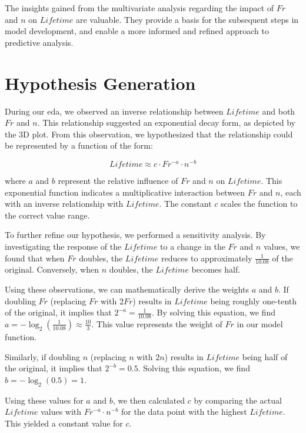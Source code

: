 The insights gained from the multivariate analysis regarding the impact of \(Fr\) and \(n\) on \(Lifetime\) are valuable. They provide a basis for the subsequent steps in model development, and enable a more informed and refined approach to predictive analysis.


\section{Hypothesis Generation}
\label{sec:bearings-hypothesis}

During our \ac{eda}, we observed an inverse relationship between \(Lifetime\) and both \(Fr\) and \(n\). This relationship suggested an exponential decay form, as depicted by the 3D plot. From this observation, we hypothesized that the relationship could be represented by a function of the form:

\begin{equation}
\label{eq:hypothesis}
Lifetime \approx c \cdot Fr^{-a} \cdot n^{-b}
\end{equation}

where \(a\) and \(b\) represent the relative influence of \(Fr\) and \(n\) on \(Lifetime\). This exponential function indicates a multiplicative interaction between \(Fr\) and \(n\), each with an inverse relationship with \(Lifetime\). The constant \(c\) scales the function to the correct value range.

To further refine our hypothesis, we performed a sensitivity analysis. By investigating the response of the \(Lifetime\) to a change in the \(Fr\) and \(n\) values, we found that when \(Fr\) doubles, the \(Lifetime\) reduces to approximately \(\frac{1}{10.08}\) of the original. Conversely, when \(n\) doubles, the \(Lifetime\) becomes half. 

Using these observations, we can mathematically derive the weights \(a\) and \(b\). If doubling \(Fr\) (replacing \(Fr\) with \(2Fr\)) results in \(Lifetime\) being roughly one-tenth of the original, it implies that \(2^{-a} = \frac{1}{10.08}\). By solving this equation, we find \(a = -\log_2(\frac{1}{10.08}) \approx \frac{10}{3}\). This value represents the weight of \(Fr\) in our model function.

Similarly, if doubling \(n\) (replacing \(n\) with \(2n\)) results in \(Lifetime\) being half of the original, it implies that \(2^{-b} = 0.5\). Solving this equation, we find \(b = -\log_2(0.5) = 1\).

Using these values for \(a\) and \(b\), we then calculated \(c\) by comparing the actual \(Lifetime\) values with \(Fr^{-a} \cdot n^{-b}\) for the data point with the highest \(Lifetime\). This yielded a constant value for \(c\).

